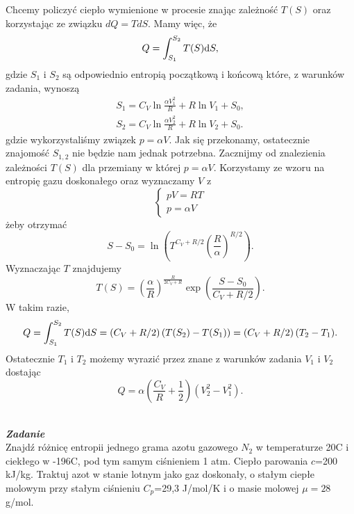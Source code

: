 \documentclass[11pt,a4paper]{article}
\newcounter{zadanie}\newcommand{\zadanie}[1][]{\addtocounter{zadanie}{1} ~\\  {\bf \emph{Zadanie \arabic{zadanie} #1 }} \\}
\begin{document}
Chcemy policzyć ciepło wymienione w procesie znając zależność $T(S)$ oraz korzystając ze związku $dQ = T dS$. Mamy więc, że
\begin{equation}
	Q = \int_{S_1}^{S_2} T(S) {\rm d}S,
\end{equation}
gdzie $S_1$ i $S_2$ są odpowiednio entropią początkową i końcową które, z warunków zadania, wynoszą
\begin{align}
	S_1 = C_V \ln \frac{\alpha V_1^2}{R} + R \ln V_1 + S_0, \\
	S_2 = C_V \ln \frac{\alpha V_2^2}{R} + R \ln V_2 + S_0.
\end{align}
gdzie wykorzystaliśmy związek $p =\alpha V$. Jak się przekonamy, ostatecznie znajomość $S_{1,2}$ nie będzie nam jednak potrzebna. 
Zacznijmy od znalezienia zależności $T(S)$ dla przemiany w której $p = \alpha V$. Korzystamy ze wzoru na entropię gazu doskonałego oraz wyznaczamy $V$ z
\begin{equation}
  \left\{
    \begin{array}{l}
      pV = RT\\
      p = \alpha V
    \end{array}
  \right.
\end{equation}
żeby otrzymać
\begin{equation}
	S - S_0 = \ln \left(  T^{C_V + R/2}  \left( \frac{R}{\alpha}\right)^{R/2}\right).
\end{equation}
Wyznaczając $T$ znajdujemy
\begin{equation}
	T(S) = \left( \frac{\alpha}{R}\right)^{\frac{R}{2 C_V + R}}\exp \left( \frac{S - S_0}{C_V + R/2}\right).
\end{equation}
W takim razie,
\begin{equation}
	Q = \int_{S_1}^{S_2} T(S) {\rm d}S =  \left( C_V + R/2 \right) (T(S_2) - T(S_1)) = \left( C_V + R/2 \right) (T_2 - T_1).
\end{equation}
Ostatecznie $T_1$ i $T_2$ możemy wyrazić przez znane z warunków zadania $V_1$ i $V_2$ dostając
\begin{equation}
	Q = \alpha \left( \frac{C_V}{R} + \frac{1}{2}\right) \left(V_2^2 - V_1^2\right).
\end{equation}

\newpage



\zadanie
Znajdź różnicę entropii jednego grama azotu gazowego $N_2$ 
w temperaturze 20\degree C i ciekłego w -196\degree C, pod tym samym ciśnieniem 1 atm. 
Ciepło parowania $c$=200\,kJ/kg. Traktuj azot w stanie lotnym jako gaz doskonały, 
o stałym ciepłe molowym przy stałym ciśnieniu $C_p$=29,3 J/mol/K i o masie molowej $\mu=28$g/mol.      
\end{document}
